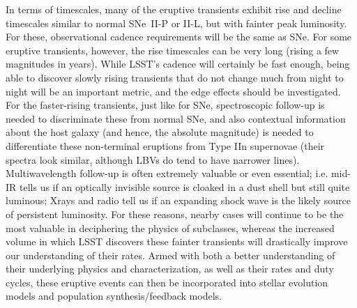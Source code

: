 In terms of timescales, many of the eruptive transients exhibit rise
and decline timescales similar to normal SNe~II-P or II-L, but with
fainter peak luminosity.  For these, observational cadence
requirements will be the same as SNe.  For some eruptive transients,
however, the rise timescales can be very long (rising a few magnitudes
in years).  While LSST's cadence will certainly be fast enough, being
able to discover slowly rising transients that do not change much from
night to night will be an important metric, and the edge effects
should be investigated.
For the faster-rising transients, just like for SNe, spectroscopic
follow-up is needed to discriminate these from normal SNe, and also
contextual information about the host galaxy (and hence, the absolute
magnitude) is needed to differentiate these non-terminal eruptions
from Type IIn supernovae (their spectra look similar, although LBVs do
tend to have narrower lines).  %
Multiwavelength follow-up is often extremely valuable or even
essential; i.e. mid-IR tells us if an optically invisible source is
cloaked in a dust shell but still quite luminous; Xrays and radio tell
us if an expanding shock wave is the likely source of persistent
luminosity.  For these reasons, nearby cases will continue to be the
most valuable in deciphering the physics of subclasses, whereas the
increased volume in which LSST discovers these fainter transients will
drastically improve our understanding of their rates.  Armed with both
a better understanding of their underlying physics and
characterization, as well as their rates and duty cycles, these
eruptive events can then be incorporated into stellar evolution models
and population synthesis/feedback models.

